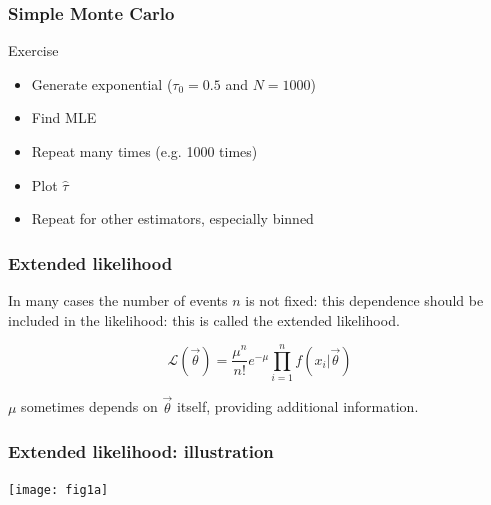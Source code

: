 \documentclass[9pt]{beamer}
\newif\ifmyhide
\newcommand\myhide[1]{%
\ifmyhide \vspace{15pt} \begin{center} \myexample{(blackboard)}\end{center} \vspace{15pt} \else #1 \fi
}
\begin{document}
\begin{frame}
 \frametitle{Simple Monte Carlo}
 
 \begin{exampleblock}{Exercise}
  \begin{itemize}
   \item Generate exponential ($\tau_0=0.5$ and $N=1000$)
   \item Find MLE
   \item Repeat many times (e.g. 1000 times)
   \item Plot $\hat{\tau}$%
   \item Repeat for other estimators, especially binned
  \end{itemize}
 \end{exampleblock}

\end{frame}





\begin{frame}
 \frametitle{Extended likelihood}
 
 \myhide{
 In many cases the number of events $n$ is not fixed: this dependence should be included in the likelihood: this is called the extended likelihood.
 
 $$\mathcal{L}(\vec{\theta}) = \frac{\mu^n}{n!}e^{-\mu} \prod_{i=1}^{n} f(x_i | \vec{\theta})$$
 
 $\mu$ sometimes depends on $\vec{\theta}$ itself, providing additional information.
 }
\end{frame}

\begin{frame}
 \frametitle{Extended likelihood: illustration}
 
 
 \begin{center}
  \texttt{[image: fig1a]}
 \end{center}

\end{frame}
\end{document}
